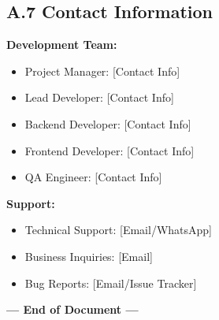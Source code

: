 \documentclass[12pt,a4paper]{article}
\begin{document}
\subsection*{A.7 Contact Information}

\textbf{Development Team:}
\begin{itemize}
    \item Project Manager: [Contact Info]
    \item Lead Developer: [Contact Info]
    \item Backend Developer: [Contact Info]
    \item Frontend Developer: [Contact Info]
    \item QA Engineer: [Contact Info]
\end{itemize}

\textbf{Support:}
\begin{itemize}
    \item Technical Support: [Email/WhatsApp]
    \item Business Inquiries: [Email]
    \item Bug Reports: [Email/Issue Tracker]
\end{itemize}

\vspace{1cm}

\begin{center}
\textbf{--- End of Document ---}
\end{center}
\end{document}
